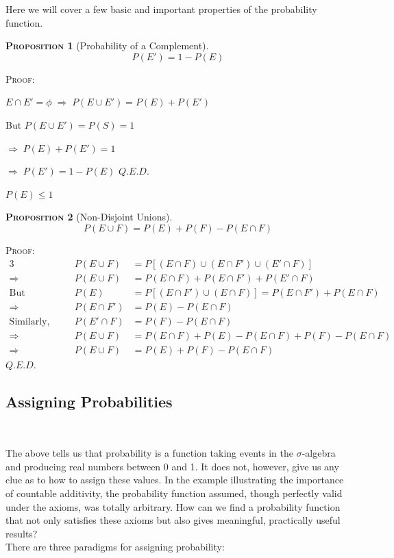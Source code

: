 \documentclass[12pt,a4paper]{article}
\newtheorem{proposition}{\textsc{Proposition}}[section]
\begin{document}
Here we will cover a few basic and important properties of the probability function.\par
\vspace{12pt}

\begin{proposition}[Probability of a Complement]
$$P(E') = 1 - P(E)$$
\end{proposition}

\noindent \textsc{Proof:}\par
\vspace{12pt}
\indent $E \cap E' = \phi \; \Rightarrow \; P(E \cup E') = P(E) + P(E')$\par
\indent But $P(E \cup E') = P(S) = 1$\par
\indent $\Rightarrow \; P(E) + P(E') = 1$\par
\indent $\Rightarrow \; P(E') = 1 - P(E)$ \hfill $Q.E.D.$\par

\vspace{12pt}
 $P(E) \leq 1$

\begin{proposition}[Non-Disjoint Unions]
$$P(E \cup F) = P(E) + P(F) - P(E \cap F)$$
\end{proposition}

\noindent\textsc{Proof:}
\begin{alignat*}{3}
& & P(E \cup F) &= P[(E \cap F) \cup (E \cap F') \cup (E' \cap F)]\\
\Rightarrow&\quad& P(E \cup F) &= P(E \cap F) + P(E \cap F') + P(E' \cap F)\\
\text{But }&\quad& P(E) &= P[(E \cap F') \cup (E \cap F)] = P(E \cap F') + P(E \cap F)\\
\Rightarrow&\quad& P(E \cap F') &= P(E) - P(E \cap F)\\
\text{Similarly,}&\quad& P(E' \cap F) &= P(F) - P(E \cap F)\\
\Rightarrow&\quad& P(E \cup F) &= P(E \cap F) + P(E) - P(E \cap F) + P(F) - P(E \cap F)\\
\Rightarrow&\quad& P(E \cup F) &= P(E) + P(F) - P(E \cap F)
\end{alignat*}\hfill $Q.E.D.$



\subsection{Assigning Probabilities}$\;$

The above tells us that probability is a function taking events in the $\sigma$-algebra and producing real numbers between 0 and 1. It does not, however, give us any clue as to how to assign these values. In the example illustrating the importance of countable additivity, the probability function assumed, though perfectly valid under the axioms, was totally arbitrary. How can we find a probability function that not only satisfies these axioms but also gives meaningful, practically useful results?\\
There are three paradigms for assigning probability:\par
\end{document}
